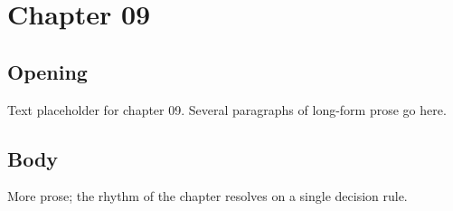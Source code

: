 \chapter{Chapter 09}
\section{Opening}
Text placeholder for chapter 09. Several paragraphs of long-form prose go here.
\section{Body}
More prose; the rhythm of the chapter resolves on a single decision rule.
